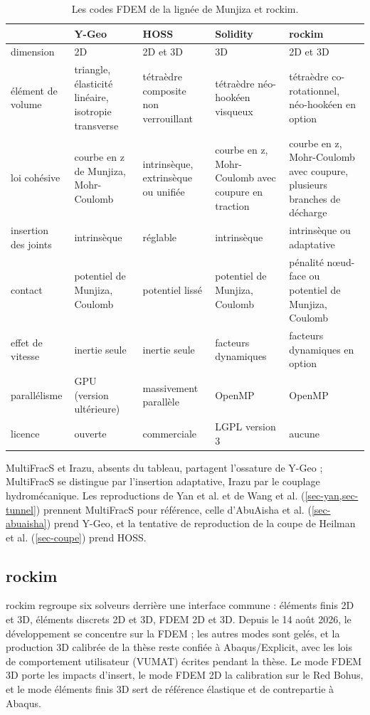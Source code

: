 \begin{table}[htbp]
\centering
\caption{Les codes FDEM de la lignée de Munjiza et rockim.}
\label{tab-codes}
\small
\begin{tabularx}{\linewidth}{@{}l X X X X@{}}
\toprule
 & Y-Geo & HOSS & Solidity & rockim \\
\midrule
dimension & 2D & 2D et 3D & 3D & 2D et 3D \\
élément de volume & triangle, élasticité linéaire, isotropie transverse & tétraèdre composite non verrouillant & tétraèdre néo-hookéen visqueux & tétraèdre co-rotationnel, néo-hookéen en option \\
loi cohésive & courbe en z de Munjiza, Mohr-Coulomb & intrinsèque, extrinsèque ou unifiée & courbe en z, Mohr-Coulomb avec coupure en traction & courbe en z, Mohr-Coulomb avec coupure, plusieurs branches de décharge \\
insertion des joints & intrinsèque & réglable & intrinsèque & intrinsèque ou adaptative \\
contact & potentiel de Munjiza, Coulomb & potentiel lissé & potentiel de Munjiza, Coulomb & pénalité nœud-face ou potentiel de Munjiza, Coulomb \\
effet de vitesse & inertie seule & inertie seule & facteurs dynamiques & facteurs dynamiques en option \\
parallélisme & GPU (version ultérieure) & massivement parallèle & OpenMP & OpenMP \\
licence & ouverte & commerciale & LGPL version 3 & aucune \\
\bottomrule
\end{tabularx}
\end{table}

MultiFracS et Irazu, absents du tableau, partagent l'ossature de Y-Geo ; MultiFracS se distingue par l'insertion adaptative, Irazu par le couplage hydromécanique. Les reproductions de Yan et al. et de Wang et al. (\cref{sec-yan,sec-tunnel}) prennent MultiFracS pour référence, celle d'AbuAisha et al. (\cref{sec-abuaisha}) prend Y-Geo, et la tentative de reproduction de la coupe de Heilman et al. (\cref{sec-coupe}) prend HOSS.

\subsection{rockim}

rockim regroupe six solveurs derrière une interface commune : éléments finis 2D et 3D, éléments discrets 2D et 3D, FDEM 2D et 3D. Depuis le 14 août 2026, le développement se concentre sur la FDEM ; les autres modes sont gelés, et la production 3D calibrée de la thèse reste confiée à Abaqus/Explicit, avec les lois de comportement utilisateur (VUMAT) écrites pendant la thèse. Le mode FDEM 3D porte les impacts d'insert, le mode FDEM 2D la calibration sur le Red Bohus, et le mode éléments finis 3D sert de référence élastique et de contrepartie à Abaqus.

